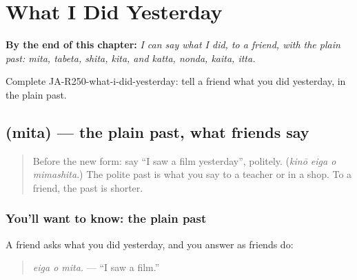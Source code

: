 
\chapter{What I Did Yesterday}
\label{ch:ja-what-i-did-yesterday}

\begin{chapteropening}
\textbf{By the end of this chapter:} \emph{I can say what I did, to a friend, with the plain past: mita, tabeta, shita, kita, and katta, nonda, kaita, itta.}

Complete JA-R250-what-i-did-yesterday: tell a friend what you did yesterday, in the plain past.
\end{chapteropening}

\section[\texorpdfstring{\ja{みた} (mita)}{みた (mita)}]{ (mita) — the plain past, what friends say}

\label{lesson:JA-C250-mita}



\begin{quote}
Before the new form: say \textquotedblleft{}I saw a film yesterday\textquotedblright{}, politely. (\emph{kinō eiga o mimashita}.) The polite past is what you say to a teacher or in a shop. To a friend, the past is shorter.
\end{quote}

\subsection*{You'll want to know: the plain past}
A friend asks what you did yesterday, and you answer as friends do:

\begin{quote}
\textbf{ }
\end{quote}

\begin{quote}
\emph{eiga o mita.} — \textquotedblleft{}I saw a film.\textquotedblright{}
\end{quote}

\begin{quote}
\textbf{  }
\end{quote}

